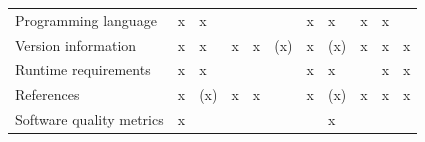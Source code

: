 \documentclass{article}
\begin{document}
\begin{figure}
\begin{tabular}{lllllllllll}
\\
Programming language

& x

& x

& 

& 

& 

& x

& x

& x

& x

& 

\\
Version information

& x

& x

& x

& x

& (x)

& x

& (x)

& x

& x

& x

\\
Runtime requirements

& x

& x

& 

& 

& 

& x

& x

& 

& x

& x

\\
References

& x

& (x)

& x

& x

& 

& x

& (x)

& x

& x

& x

\\
Software quality metrics

& x

& 

& 

& 

& 

& 

& x


\end{tabular}
\end{figure}
\end{document}
